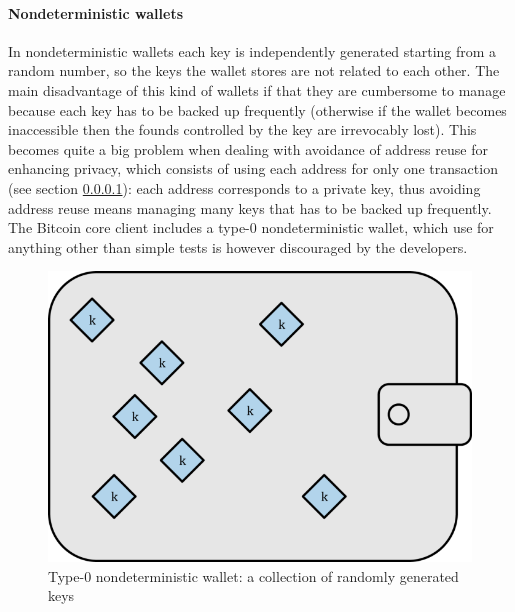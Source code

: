 \paragraph{Nondeterministic wallets} In nondeterministic wallets each key is
independently generated starting from a random number, so the keys the wallet
stores are not related to each other. The main disadvantage of this kind of
wallets if that they are cumbersome to manage because each key has to be backed
up frequently (otherwise if the wallet becomes inaccessible then the founds
controlled by the key are irrevocably lost). This becomes quite a big problem
when dealing with avoidance of address reuse for enhancing privacy, which
consists of using each address for only one transaction (see section \ref{}):
each address corresponds to a private key, thus avoiding address reuse means
managing many keys that has to be backed up frequently. The Bitcoin core client
includes a type-0 nondeterministic wallet, which use for anything other than
simple tests is however discouraged by the developers.
\begin{figure}[!htb]
	\centering
	\includegraphics[width=0.5\linewidth]{img/nondeterministic-wallet.png}
	\caption{Type-0 nondeterministic wallet: a collection of randomly generated keys}
	\label{fig:nondeterministic-wallet}
\end{figure}

